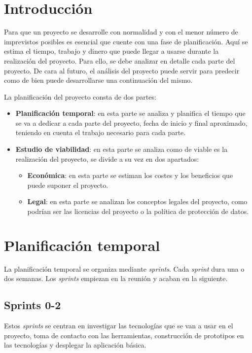 
\section{Introducción}
Para que un proyecto se desarrolle con normalidad y con el menor número de imprevistos posibles es esencial que cuente con una fase de planificación. Aquí se estima el tiempo, trabajo y dinero que puede llegar a usarse durante la realización del proyecto. Para ello, se debe analizar en detalle cada parte del proyecto. De cara al futuro, el análisis del proyecto puede servir para predecir como de bien puede desarrollarse una continuación del mismo.

La planificación del proyecto consta de dos partes:
\begin{itemize}
	\tightlist
	\item \textbf{Planificación temporal}: en esta parte se analiza y planifica el tiempo que se va a dedicar a cada parte del proyecto, fecha de inicio y final aproximado, teniendo en cuenta el trabajo necesario para cada parte.
	\item \textbf{Estudio de viabilidad}: en esta parte se analiza como de viable es la realización del proyecto, se divide a su vez en dos apartados:
	
	\begin{itemize}
		\tightlist
		\item \textbf{Económica}: en esta parte se estiman los costes y los beneficios que puede suponer el proyecto.
		\item \textbf{Legal}: en esta parte se analizan los conceptos legales del proyecto, como podrían ser las licencias del proyecto o la política de protección de datos.
	\end{itemize}
\end{itemize}

\section{Planificación temporal}
La planificación temporal se organiza mediante \textit{sprints}. Cada \textit{sprint} dura una o dos semanas. Los \textit{sprints} empiezan en la reunión y acaban en la siguiente.\\

\subsection{Sprints 0-2}
Estos \textit{sprints} se centran en investigar las tecnologías que se van a usar en el proyecto, toma de contacto con las herramientas, construcción de prototipos en las tecnologías y desplegar la aplicación básica.\\

